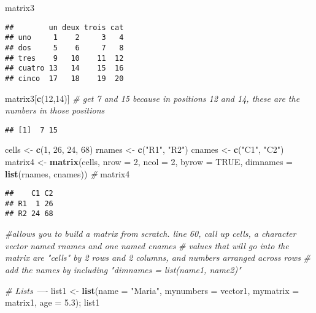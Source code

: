 \documentclass[]{article}
\newenvironment{Shaded}{\begin{snugshade}}{\end{snugshade}}
\newcommand{\KeywordTok}[1]{\textcolor[rgb]{0.13,0.29,0.53}{\textbf{#1}}}
\newcommand{\DataTypeTok}[1]{\textcolor[rgb]{0.13,0.29,0.53}{#1}}
\newcommand{\DecValTok}[1]{\textcolor[rgb]{0.00,0.00,0.81}{#1}}
\newcommand{\FloatTok}[1]{\textcolor[rgb]{0.00,0.00,0.81}{#1}}
\newcommand{\StringTok}[1]{\textcolor[rgb]{0.31,0.60,0.02}{#1}}
\newcommand{\CommentTok}[1]{\textcolor[rgb]{0.56,0.35,0.01}{\textit{#1}}}
\newcommand{\OtherTok}[1]{\textcolor[rgb]{0.56,0.35,0.01}{#1}}
\newcommand{\NormalTok}[1]{#1}
\begin{document}
\begin{Shaded}
\begin{Highlighting}[]
\NormalTok{matrix3}
\end{Highlighting}
\end{Shaded}

\begin{verbatim}
##        un deux trois cat
## uno     1    2     3   4
## dos     5    6     7   8
## tres    9   10    11  12
## cuatro 13   14    15  16
## cinco  17   18    19  20
\end{verbatim}

\begin{Shaded}
\begin{Highlighting}[]
\NormalTok{matrix3[}\KeywordTok{c}\NormalTok{(}\DecValTok{12}\NormalTok{,}\DecValTok{14}\NormalTok{)] }\CommentTok{# get 7 and 15 because in positions 12 and 14, these are the numbers in those positions}
\end{Highlighting}
\end{Shaded}

\begin{verbatim}
## [1]  7 15
\end{verbatim}

\begin{Shaded}
\begin{Highlighting}[]
\NormalTok{cells <-}\StringTok{ }\KeywordTok{c}\NormalTok{(}\DecValTok{1}\NormalTok{, }\DecValTok{26}\NormalTok{, }\DecValTok{24}\NormalTok{, }\DecValTok{68}\NormalTok{)}
\NormalTok{rnames <-}\StringTok{ }\KeywordTok{c}\NormalTok{(}\StringTok{"R1"}\NormalTok{, }\StringTok{"R2"}\NormalTok{)}
\NormalTok{cnames <-}\StringTok{ }\KeywordTok{c}\NormalTok{(}\StringTok{"C1"}\NormalTok{, }\StringTok{"C2"}\NormalTok{) }
\NormalTok{matrix4 <-}\StringTok{ }\KeywordTok{matrix}\NormalTok{(cells, }\DataTypeTok{nrow =} \DecValTok{2}\NormalTok{, }\DataTypeTok{ncol =} \DecValTok{2}\NormalTok{, }\DataTypeTok{byrow =} \OtherTok{TRUE}\NormalTok{,}
  \DataTypeTok{dimnames =} \KeywordTok{list}\NormalTok{(rnames, cnames)) }\CommentTok{# }
\NormalTok{matrix4}
\end{Highlighting}
\end{Shaded}

\begin{verbatim}
##    C1 C2
## R1  1 26
## R2 24 68
\end{verbatim}

\begin{Shaded}
\begin{Highlighting}[]
\CommentTok{#allows you to build a matrix from scratch. line 60, call up cells, a character vector named rnames and one named cnames}
\CommentTok{# values that will go into the matrix are "cells" by 2 rows and 2 columns, and numbers arranged across rows}
\CommentTok{# add the names by including "dimnames = list(name1, name2)"}

\CommentTok{# Lists ---- }
\NormalTok{list1 <-}\StringTok{ }\KeywordTok{list}\NormalTok{(}\DataTypeTok{name =} \StringTok{"Maria"}\NormalTok{, }\DataTypeTok{mynumbers =}\NormalTok{ vector1, }\DataTypeTok{mymatrix =}\NormalTok{ matrix1, }\DataTypeTok{age =} \FloatTok{5.3}\NormalTok{); list1}
\end{Highlighting}
\end{Shaded}
\end{document}
